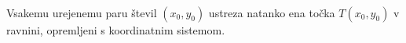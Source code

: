                         
                        
                        
                        
                        
                        

                        
                        
                        
                

                ~

                Vsakemu urejenemu paru števil $(x_0,y_0)$ ustreza natanko ena točka $T(x_0,y_0)$ v ravnini, opremljeni s koordinatnim sistemom.
       

